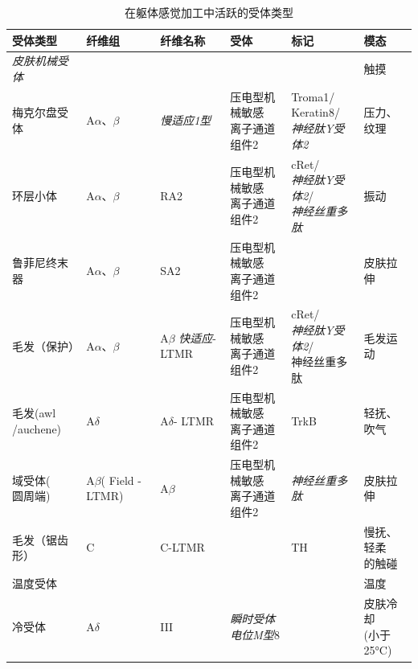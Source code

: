 \begin{table}[htbp]
	\caption{在躯体感觉加工中活跃的受体类型} \label{tab:18_2} \centering
	\begin{tabular}{llllll}
		\toprule
		受体类型 & 纤维组 & 纤维名称 & 受体 & 标记 & 模态\\
		\midrule
		\textit{皮肤机械受体} & &  &  &  & 触摸 \\
		梅克尔盘受体 & A$\alpha$、$\beta$ & \textit{慢适应1型} & \makecell[l]{压电型机械敏感\\离子通道组件}2 & \makecell[l]{Troma1/\\Keratin8/\\\textit{神经肽Y受体2}} & \makecell[l]{压力、\\纹理} \\
		环层小体 & A$\alpha$、$\beta$ & RA2 & \makecell[l]{压电型机械敏感\\离子通道组件}2 & \makecell[l]{cRet/\\\textit{神经肽Y受体2}/\\\textit{神经丝重多肽}} & 振动 \\
		鲁菲尼终末器 & A$\alpha$、$\beta$ & SA2 & \makecell[l]{压电型机械敏感\\离子通道组件}2 &  & 皮肤拉伸 \\
		毛发（保护） & A$\alpha$、$\beta$ & A$\beta$ \textit{快适应}-LTMR & \makecell[l]{压电型机械敏感\\离子通道组件}2 & \makecell[l]{cRet/\\\textit{神经肽Y受体2}/\\神经丝重多肽} & 毛发运动 \\
		\makecell[l]{毛发(awl\\/auchene)} & A$\delta$ & \makecell[l]{A$\delta$-\\LTMR} & \makecell[l]{压电型机械敏感\\离子通道组件}2 & TrkB & 轻抚、吹气 \\
		\makecell[l]{域受体(\\圆周端)} & \makecell[l]{A$\beta$(\\Field\\-LTMR)} & A$\beta$ & \makecell[l]{压电型机械敏感\\离子通道组件}2 & \textit{神经丝重多肽} & 皮肤拉伸 \\
		毛发（锯齿形） & C & C-LTMR &  & TH & \makecell[l]{慢抚、轻柔\\的触碰} \\
		温度受体 &  &  &  &  & 温度 \\
		冷受体 & A$\delta$ & III & \textit{瞬时受体电位M型}8 &  & \makecell[l]{皮肤冷却\\(小于 25°C)} \\

\end{tabular}
\end{table}
